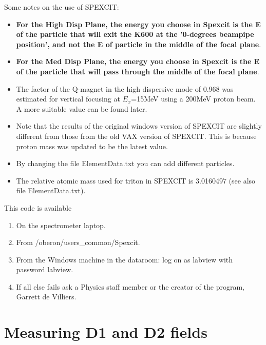 \documentclass[11pt]{report}
\begin{document}
Some notes on the use of SPEXCIT:
\begin{itemize}
\item {\bf For the High Disp Plane, the energy you choose in Spexcit is the 
      E of the particle that  will exit the K600 at the '0-degrees beampipe position', 
      and not the E of particle in the middle of the focal plane}.
\item {\bf For the Med Disp Plane, the energy you choose in Spexcit is the 
      E of the particle that  will pass through the middle of the focal plane}.
\item The factor of the Q-magnet in the high dispersive mode of 0.968 was 
      estimated for vertical focusing at $E_x$=15MeV using a 200MeV proton
      beam. A more suitable value can be found later.
\item Note that the results of the original windows version of 
      SPEXCIT are slightly different from those from
      the old VAX version of SPEXCIT. This is because proton mass was
      updated to be the latest value.
\item By changing the file ElementData.txt you can add different particles.
\item The relative atomic mass used for triton in SPEXCIT is 3.0160497
      (see also file  ElementData.txt).
\end{itemize}


This code is available 
\begin{enumerate}
\item On the spectrometer laptop.
\item From /oberon/users\_common/Spexcit.
\item From the Windows machine in the dataroom: log on as labview with password labview.
\item If all else fails ask a Physics staff member or the creator 
of the program, Garrett de Villiers.
\end{enumerate}




\section{Measuring D1 and D2 fields}\label{sec:NMR}
\end{document}
